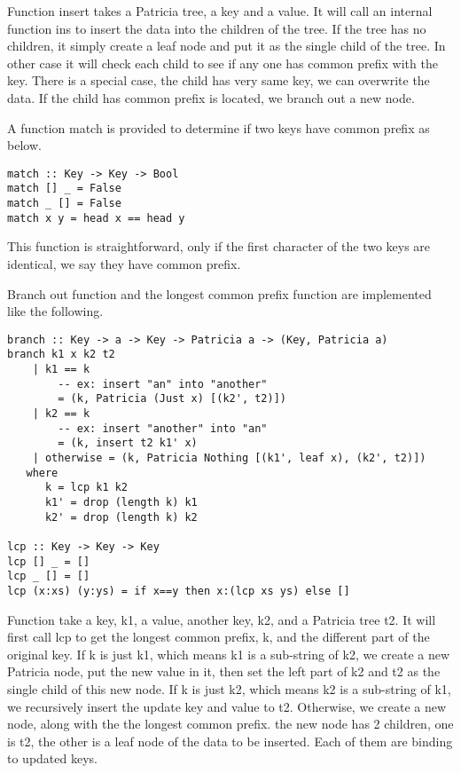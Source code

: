 \documentclass{article}
\begin{document}
Function insert takes a Patricia tree, a key and a value. It will call
an internal function ins to insert the data into the children of the tree.
If the tree has no children, it simply create a leaf node and put it
as the single child of the tree. In other case it will check each child
to see if any one has common prefix with the key. There is a special case,
the child has very same key, we can overwrite the data. If the child has common
prefix is located, we branch out a new node.

A function match is provided to determine if two keys have common prefix as 
below.

\begin{lstlisting}
match :: Key -> Key -> Bool
match [] _ = False
match _ [] = False
match x y = head x == head y
\end{lstlisting}

This function is straightforward, only if the first character of the two keys
are identical, we say they have common prefix.

Branch out function and the longest common prefix function are implemented like
the following.

\begin{lstlisting}
branch :: Key -> a -> Key -> Patricia a -> (Key, Patricia a)
branch k1 x k2 t2 
    | k1 == k 
        -- ex: insert "an" into "another" 
        = (k, Patricia (Just x) [(k2', t2)])
    | k2 == k 
        -- ex: insert "another" into "an"
        = (k, insert t2 k1' x)
    | otherwise = (k, Patricia Nothing [(k1', leaf x), (k2', t2)]) 
   where
      k = lcp k1 k2
      k1' = drop (length k) k1
      k2' = drop (length k) k2

lcp :: Key -> Key -> Key
lcp [] _ = []
lcp _ [] = []
lcp (x:xs) (y:ys) = if x==y then x:(lcp xs ys) else []
\end{lstlisting}

Function take a key, k1, a value, another key, k2, and a Patricia tree t2. It will first
call lcp to get the longest common prefix, k, and the different part of the original key.
If k is just k1, which means k1 is a sub-string of k2, we create a new Patricia node, 
put the new value in it, then set the left part of k2 and t2 as the single child of this 
new node. If k is just k2, which means k2 is a sub-string of k1, we recursively insert
the update key and value to t2. Otherwise, we create a new node, along with the the longest
common prefix. the new node has 2 children, one is t2, the other is a leaf node of the data
to be inserted. Each of them are binding to updated keys.
\end{document}
